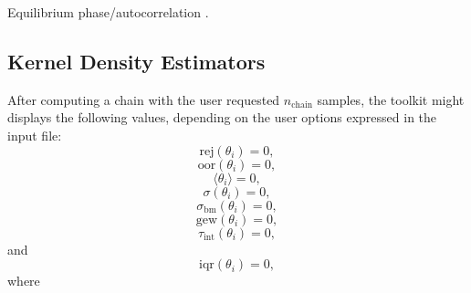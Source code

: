 Equilibrium phase/autocorrelation \cite{BrRo98} \cite{So96}.

\subsection{Kernel Density Estimators}

After computing a chain with the user requested $n_{\text{chain}}$ samples, the toolkit might displays the following values, depending on the user options expressed in the input file:
\begin{equation}\label{eq-dram-chain-stats-rej}
\text{rej}(\theta_i) = 0,
\end{equation}
%
\begin{equation}\label{eq-dram-chain-stats-oor}
\text{oor}(\theta_i) = 0,
\end{equation}
%
\begin{equation}\label{eq-dram-chain-stats-mean}
\langle\theta_i\rangle = 0,
\end{equation}
%
\begin{equation}\label{eq-dram-chain-stats-std}
\sigma(\theta_i) = 0,
\end{equation}
%
\begin{equation}\label{eq-dram-chain-stats-bm}
\sigma_{\text{bm}}(\theta_i) = 0,
\end{equation}
%
\begin{equation}\label{eq-dram-chain-stats-gew}
\text{gew}(\theta_i) = 0,
\end{equation}
\begin{equation}\label{eq-dram-chain-stats-tau-int}
\tau_{\text{int}}(\theta_i) = 0,
\end{equation}
and
\begin{equation}\label{eq-dram-chain-stats-iqr}
\text{iqr}(\theta_i) = 0,
\end{equation}
where


